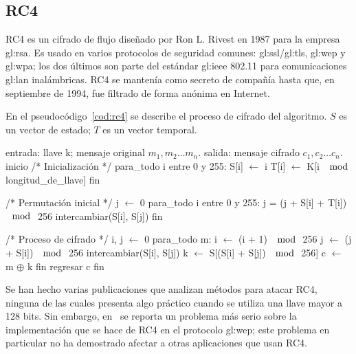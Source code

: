 %
%

\subsection{RC4}

RC4 es un cifrado de flujo diseñado por Ron L. Rivest en 1987 para la empresa
\gls{gl:rsa}. Es usado en varios protocolos de seguridad comunes:
\gls{gl:ssl}/\gls{gl:tls}, \gls{gl:wep} y \gls{gl:wpa}; los
dos últimos son parte del estándar \gls{gl:ieee} 802.11 para
comunicaciones \gls{gl:lan} inalámbricas. RC4 se mantenía como secreto de
compañía hasta que, en septiembre de 1994, fue filtrado de forma anónima en
Internet.

En el pseudocódigo~\ref{cod:rc4} se describe el proceso de cifrado del
algoritmo. $ S $ es un vector de estado; $ T $ es un vector temporal.

\begin{pseudocodigo}[%
    caption={Proceso de cifrado de RC4.},
    label={cod:rc4}%
  ]
    entrada: llave k; mensaje original $ m_1, m_2 \dots m_n $.
    salida:  mensaje cifrado $ c_1, c_2 \dots c_n $.
    inicio
      /* Inicialización */
      para_todo i entre 0 y 255:
        S[i] $\gets$ i
        T[i] $\gets$ K[i $\mod$ longitud_de_llave]
      fin

      /* Permutación inicial */
      j $\gets$ 0
      para_todo i entre 0 y 255:
        j = (j + S[i] + T[i]) $\mod$ 256
        intercambiar(S[i], S[j])
      fin

      /* Proceso de cifrado */
      i, j $\gets$ 0
      para_todo m:
        i $\gets$ (i + 1) $\mod$ 256
        j $\gets$ (j + S[i]) $\mod$ 256
        intercambiar(S[i], S[j])
        k $\gets$ S[(S[i] + S[j]) $\mod$ 256]
        c $\gets$ m $\oplus$ k
      fin
      regresar c
    fin
\end{pseudocodigo}

Se han hecho varias publicaciones que analizan métodos para atacar RC4, ninguna
de las cuales presenta algo práctico cuando se utiliza una llave mayor a
128 bits. Sin embargo, en~\cite{ataque_wep} se reporta un problema más serio
sobre la implementación que se hace de RC4 en el protocolo \gls{gl:wep};
este problema en particular no ha demostrado afectar a otras aplicaciones que
usan RC4.
